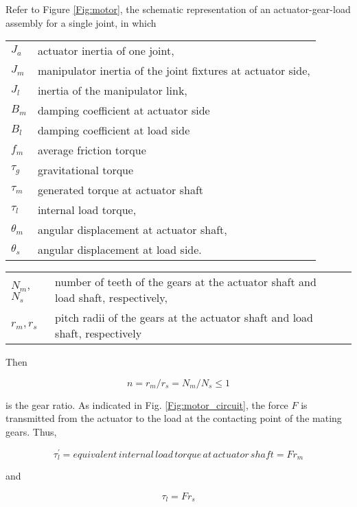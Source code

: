 \noindent Refer to Figure \ref{Fig:motor}, the schematic representation of an actuator-gear-load assembly for a single joint, in which \newline


\begin{tabular}{l l}
	\(J_a\) & actuator inertia of one joint,\\
	\(J_m\) & manipulator inertia of the joint fixtures at actuator side,\\
	\(J_l\) & inertia of the manipulator link,\\
	\(B_m\) & damping coefficient at actuator side\\
	\(B_l\) & damping coefficient at load side\\
	\(f_m\) & average friction torque\\
	\(\tau_g\) & gravitational torque \\
	\(\tau_m\) & generated torque at actuator shaft \\
	\(\tau_l\) & internal load torque,\\
	\(\theta_m\) & angular displacement at actuator shaft,\\
	\(\theta_s\) & angular displacement at load side.
\end{tabular}

\begin{tabular}{l l l}
	\(N_m\), \(N_s\) & number of teeth of the gears at the actuator shaft and load shaft, respectively,\\
	\(r_m, r_s\) & pitch radii of the gears at the actuator shaft and load shaft, respectively
\end{tabular} \newline

\noindent Then

\begin{equation} \label{eq:gear_ratio}
	n = r_m/r_s = N_m/N_s \leq 1
\end{equation}

\noindent is the gear ratio. As indicated in Fig. \ref{Fig:motor_circuit}, the force $F$ is transmitted from the actuator to the load at the contacting point of the mating gears. Thus,

\begin{equation} \label{eq:internal_load_torque}
	\tau_l^{'} = equivalent\, internal\,load\,torque\,at\,actuator\,shaft = Fr_m
\end{equation}

\noindent and

\begin{equation} \label{eq:tl}
	\tau_l = F r_s
\end{equation}

